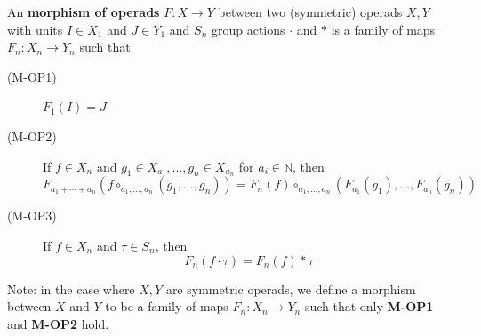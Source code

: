 \begin{definition}
    An \textbf{morphism of operads} $F: X \to Y$ between two 
    (symmetric) operads $X, Y$ with units $I \in X_1$ and $J \in Y_1$ 
    and $S_n$ group actions $\cdot$ and $*$
    is a family of maps $F_n: X_n \to Y_n$ such that 
    \begin{description}
        \item[(M-OP1)] $F_1(I) = J$ 
        \item[(M-OP2)] If $f \in X_n$ and $g_1 \in X_{a_1}, \dots, g_n \in X_{a_n}$ 
        for $a_i \in \mathbb{N}$, then 
        \[
            F_{a_1 + \cdots + a_n}(f \circ_{a_1, \dots, a_n}(g_1, \dots, g_n))
            =
            F_n(f)\circ_{a_1, \dots, a_n}(F_{a_1}(g_1), \dots, F_{a_n}(g_n))
        \] 
        \item[(M-OP3)] If $f \in X_n$ and $\tau \in S_n$, then 
        \[
            F_n(f \cdot \tau) = F_n(f) * \tau 
        \]
    \end{description}
\end{definition}
Note: in the case where $X, Y$ are symmetric operads, we define a morphism between 
$X$ and $Y$ to be a family of maps $F_n: X_n \to Y_n$ such that only \textbf{M-OP1}
and \textbf{M-OP2} hold. 

